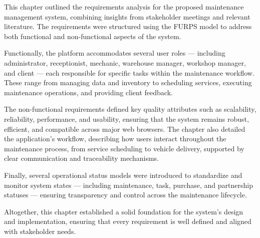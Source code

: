 This chapter outlined the requirements analysis for the proposed maintenance management system, combining insights from stakeholder meetings and relevant literature. The requirements were structured using the FURPS model to address both functional and non-functional aspects of the system.

Functionally, the platform accommodates several user roles — including administrator, receptionist, mechanic, warehouse manager, workshop manager, and client — each responsible for specific tasks within the maintenance workflow. These range from managing data and inventory to scheduling services, executing maintenance operations, and providing client feedback.

The non-functional requirements defined key quality attributes such as scalability, reliability, performance, and usability, ensuring that the system remains robust, efficient, and compatible across major web browsers. The chapter also detailed the application’s workflow, describing how users interact throughout the maintenance process, from service scheduling to vehicle delivery, supported by clear communication and traceability mechanisms.

Finally, several operational status models were introduced to standardize and monitor system states — including maintenance, task, purchase, and partnership statuses — ensuring transparency and control across the maintenance lifecycle.

Altogether, this chapter established a solid foundation for the system’s design and implementation, ensuring that every requirement is well defined and aligned with stakeholder needs.